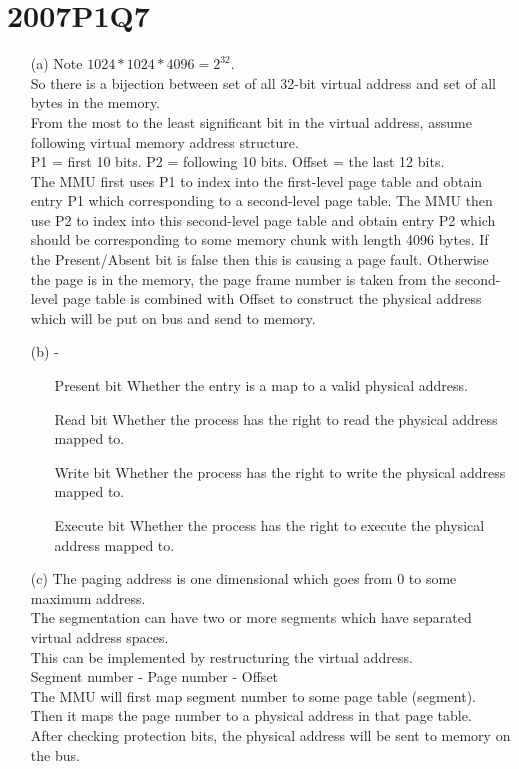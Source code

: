 \documentclass[10pt,twoside,a4paper]{article}
\begin{document}
\section{2007P1Q7}
\begin{itemize}
\item[(a)] Note $1024*1024*4096=2^{32}$.
\\So there is a bijection between set of all 32-bit virtual address and set of all bytes in the memory.
\\From the most to the least significant bit in the virtual address, assume following virtual memory address structure.
\\P1 = first 10 bits. P2 = following 10 bits. Offset = the last 12 bits.
\\The MMU first uses P1 to index into the first-level page table and obtain entry P1 which corresponding to a second-level page table. The MMU then use P2 to index into this second-level page table and obtain entry P2 which should be corresponding to some memory chunk with length 4096 bytes. If the Present/Absent bit is false then this is causing a page fault. Otherwise the page is in the memory, the page frame number is taken from the second-level page table is combined with Offset to construct the physical address which will be put on bus and send to memory.
\item[(b)]
-
\begin{itemize}
\item[Present bit] Whether the entry is a map to a valid physical address.
\item[Read bit] Whether the process has the right to read the physical address mapped to.
\item[Write bit]Whether the process has the right to write the physical address mapped to.
\item[Execute bit]Whether the process has the right to execute the physical address mapped to.
\end{itemize}
\item[(c)]
The paging address is one dimensional which goes from 0 to some maximum address.
\\The segmentation can have two or more segments which have separated virtual address spaces.
\\This can be implemented by restructuring the virtual address.
\\Segment number - Page number - Offset
\\The MMU will first map segment number to some page table (segment).
\\Then it maps the page number to a physical address in that page table.
\\After checking protection bits, the physical address will be sent to memory on the bus.
\end{itemize}
\end{document}
